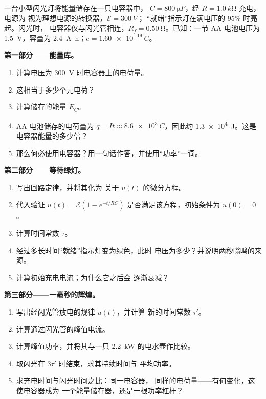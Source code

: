 \begin{problem}
\label{pb:g12:rc-rl-circuits:1}
一台小型闪光灯将能量储存在一只电容器中，
$C = \qty{800}{\micro F}$，经 $R = \qty{1.0}{k\ohm}$ 充电，电源为
视为理想电源的转换器，$\mathcal{E} = \qty{300}{V}$；
“就绪”指示灯在满电压的 $95\%$ 时亮起。闪光时，
电容器仅与闪光管相连，$R_f = \qty{0.50}{\ohm}$。已知：一节
AA 电池电压为 \qty{1.5}{V}，容量为 \qty{2.4}{A.h}；$e = \qty{1.60e-19}{C}$。

\medskip
\noindent\textbf{第一部分——能量库。}
\begin{enumerate}
  \item 计算电压为 \qty{300}{V} 时电容器上的电荷量。
  \item 这相当于多少个元电荷？
  \item 计算储存的能量 $E_C$。
  \item AA 电池储存的电荷量为 $q = It \approx \qty{8.6e3}{C}$，因此约
        \qty{1.3e4}{J}。这是电容器能量的多少倍？
  \item 那么何必使用电容器？用一句话作答，并使用“功率”一词。
\end{enumerate}

\medskip
\noindent\textbf{第二部分——等待绿灯。}
\begin{enumerate}[resume]
  \item 写出回路定律，并将其化为
        关于 $u(t)$ 的微分方程。
  \item 代入验证 $u(t) = \mathcal{E}(1 - e^{-t/RC})$
        是否满足该方程，初始条件为 $u(0) = 0$。
  \item 计算时间常数 $\tau$。
  \item 经过多长时间“就绪”指示灯变为绿色，此时
        电压为多少？并说明两秒嗡鸣的来源。
  \item 计算初始充电电流；为什么它之后会
        逐渐衰减？
\end{enumerate}

\medskip
\noindent\textbf{第三部分——一毫秒的辉煌。}
\begin{enumerate}[resume]
  \item 写出经闪光管放电的规律 $u(t)$，并计算
        新的时间常数 $\tau'$。
  \item 计算通过闪光管的峰值电流。
  \item 计算峰值功率，并将其与一只 \qty{2.2}{kW} 的电水壶作比较。
  \item 取闪光在 $3\tau'$ 时结束，求其持续时间与
        平均功率。
  \item 求充电时间与闪光时间之比：同一电容器，
        同样的电荷量——有何变化，这使电容器成为
        一个能量储存器，还是一根功率杠杆？
\end{enumerate}


\end{problem}
